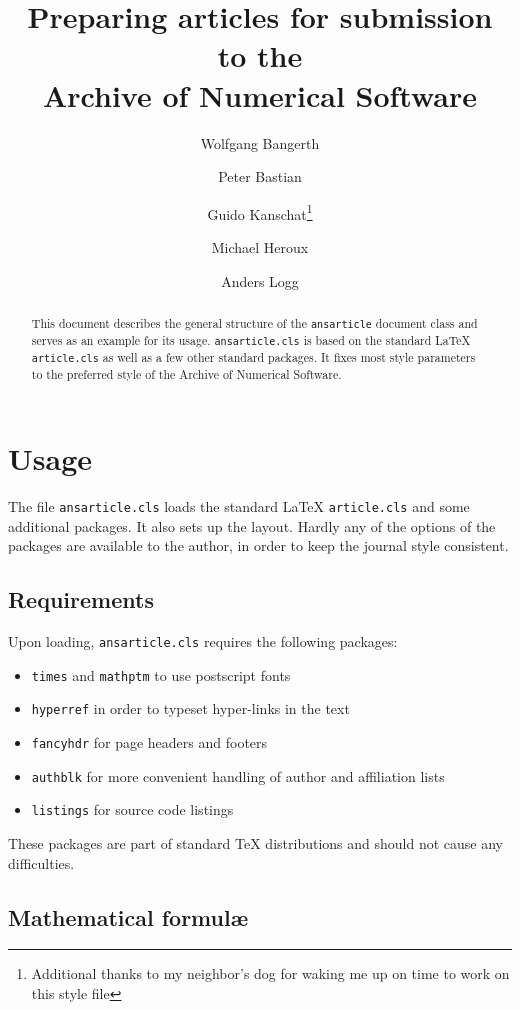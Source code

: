 \documentclass{ansarticle}
\title{Preparing articles for submission to the\\
  Archive of Numerical Software}
\author[1]{Wolfgang Bangerth}
\author[2]{Peter Bastian}
\author[1]{Guido Kanschat\thanks{Additional thanks to my neighbor's dog
  for waking me up on time to work on this style file}}
\author[3]{Michael Heroux}
\author[4]{Anders Logg}
\affil[1]{Department of Mathematics, Texas A\&M University}
\affil[2]{IWR, Universit\"at Heidelberg}
\affil[3]{Sandia National Laboratories}
\affil[4]{Simula, Oslo}
\begin{document}
\maketitle

\begin{abstract}
  This document describes the general structure of the
  \texttt{ansarticle} document class and serves as an example for its
  usage. \texttt{ansarticle.cls} is based on the standard \LaTeX{}
  \texttt{article.cls} as well as a few other standard packages. It
  fixes most style parameters to the preferred style of the Archive of
  Numerical Software.
\end{abstract}

\section{Usage}

The file \texttt{ansarticle.cls} loads the standard LaTeX
\texttt{article.cls} and some additional packages. It also sets up the
layout. Hardly any of the options of the packages are available to the
author, in order to keep the journal style consistent.

\subsection{Requirements}

Upon loading, \texttt{ansarticle.cls} requires the following packages:


\begin{itemize}
\item \texttt{times} and \texttt{mathptm} to use postscript fonts
\item \texttt{hyperref} in order to typeset hyper-links in the text
\item \texttt{fancyhdr} for page headers and footers
\item \texttt{authblk} for more convenient handling of author and
  affiliation lists
\item \texttt{listings} for source code listings
\end{itemize}
These packages are part of standard \TeX{} distributions and should
not cause any difficulties.

\subsection{Mathematical formul\ae}
\end{document}
